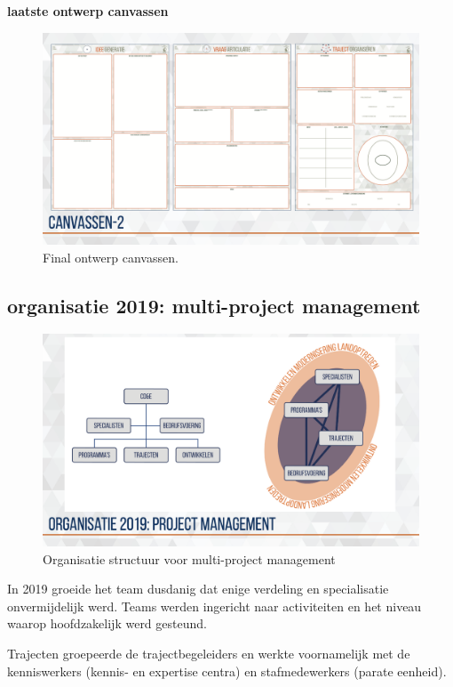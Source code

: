 \documentclass[
]{book}
\begin{document}
\textbf{laatste ontwerp canvassen}

\begin{figure}

{\centering \includegraphics[width=0.5\linewidth]{data/keynote-slides/20200430-CDE-Designprocess/20200430-CDE-Designprocess.025} 

}

\caption{Final ontwerp canvassen.}\label{fig:unnamed-chunk-21}
\end{figure}

\hypertarget{organisatie-2019-multi-project-management}{%
\subsection{organisatie 2019: multi-project management}\label{organisatie-2019-multi-project-management}}

\begin{figure}

{\centering \includegraphics[width=0.5\linewidth]{data/keynote-slides/20200430-CDE-Designprocess/20200430-CDE-Designprocess.009-2} 

}

\caption{Organisatie structuur voor multi-project management }\label{fig:unnamed-chunk-22}
\end{figure}

In 2019 groeide het team dusdanig dat enige verdeling en specialisatie onvermijdelijk werd. Teams werden ingericht naar activiteiten en het niveau waarop hoofdzakelijk werd gesteund.

Trajecten groepeerde de trajectbegeleiders en werkte voornamelijk met de kenniswerkers (kennis- en expertise centra) en stafmedewerkers (parate eenheid).
\end{document}
